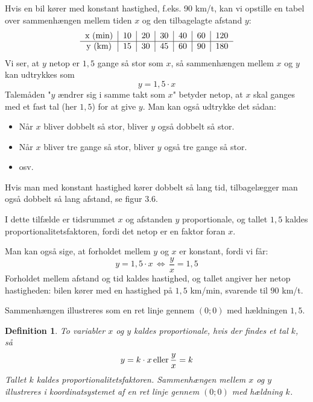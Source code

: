 \documentclass[12pt,oneside,a4paper]{article}
\newtheorem{mydef}[thm]{Definition}
\begin{document}
Hvis en bil kører med konstant hastighed, f.eks. 90 km/t, kan vi opstille en
tabel over sammenhængen mellem tiden $x$ og den tilbagelagte afstand $y$:
$$
\begin{tabular}{c|c|c|c|c|c|c}
    x ({\rm min}) & 10 & 20 & 30 & 40 & 60 & 120 \\
    \hline
    y ({\rm km})  & 15 & 30 & 45 & 60 & 90 & 180  
\end{tabular}
$$
Vi ser, at $y$ netop er $1,5$ gange så stor som $x$, så sammenhængen mellem $x$
og $y$ kan udtrykkes som
$$
y = 1,5\cdot x
$$
Talemåden "$y$ ændrer sig i samme takt som $x$" betyder netop, at $x$ skal
ganges med et fast tal (her $1,5$) for at give $y$. Man kan også udtrykke det
sådan:
\begin{itemize}
    \item Når $x$ bliver dobbelt så stor, bliver $y$ også dobbelt så stor.
    \item Når $x$ bliver tre gange så stor, bliver $y$ også tre gange så stor.
    \item osv.
\end{itemize}
Hvis man med konstant hastighed kører dobbelt så lang tid, tilbagelægger man
også dobbelt så lang afstand, se figur 3.6.

I dette tilfælde er tidsrummet $x$ og afstanden $y$ proportionale, og tallet
$1,5$ kaldes proportionalitetsfaktoren, fordi det netop er en faktor foran $x$.

Man kan også sige, at forholdet mellem $y$ og $x$ er konstant, fordi vi får:
$$
y = 1,5\cdot x \, \Leftrightarrow \, \frac{y}{x} = 1,5
$$
Forholdet mellem afstand og tid kaldes hastighed, og tallet angiver her netop
hastigheden: bilen kører med en hastighed på $1,5$ km/min, svarende til $90$
km/t.

Sammenhængen illustreres som en ret linje gennem $(0;0)$ med hældningen $1,5$.

\begin{mydef}
    To variabler $x$ og $y$ kaldes proportionale, hvis der findes et tal $k$, så
    $$
    y = k\cdot x \, {\rm eller} \, \frac{y}{x} = k
    $$
    Tallet $k$ kaldes proportionalitetsfaktoren. Sammenhængen mellem $x$ og $y$
    illustreres i koordinatsystemet af en ret linje gennem $(0; 0)$ med 
    hældning $k$.
\end{mydef}
\end{document}
